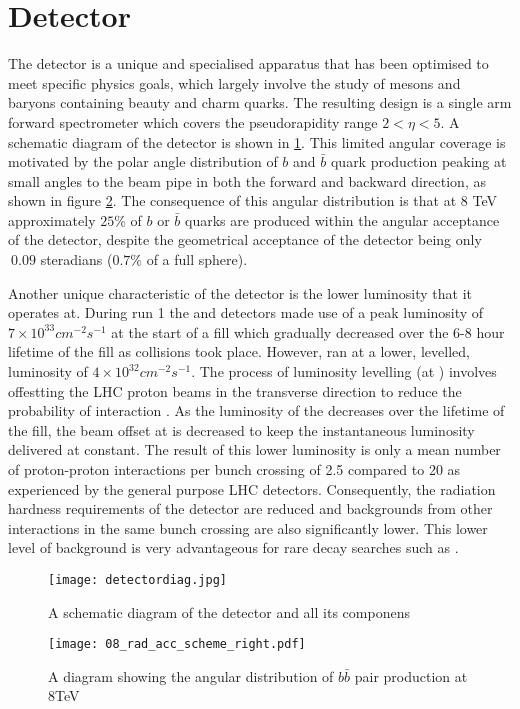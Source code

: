 
\section{Detector}
\label{sec:Detector}

The \lhcb detector is a unique and specialised apparatus that has been optimised to meet specific physics goals, which largely involve the study of mesons and baryons containing beauty and charm quarks.  The resulting design is a single arm forward spectrometer which covers the pseudorapidity range $2 < \eta < 5$.  A schematic diagram of the detector is shown in \ref{fig:detectdiag}.  This limited angular coverage is motivated by the polar angle distribution of  $b$ and $\bar{b}$ quark production peaking at small angles to the beam pipe in both the forward and backward direction, as shown in figure \ref{fig:bbarprod}.  The consequence of this angular distribution is that at 8 TeV approximately $25\%$ of $b$ or $\bar{b}$ quarks are produced within the angular acceptance of the \lhcb detector, despite the geometrical acceptance of the detector being only $~0.09$ steradians ($0.7\%$ of a full sphere).

Another unique characteristic of the \lhcb detector is the lower luminosity that it operates at.  During run 1 the \atlas and \cms detectors made use of a peak luminosity of $7\times 10^{33}cm^{-2}s^{-1}$ at the start of a fill which gradually decreased over the 6-8 hour lifetime of the fill as collisions took place.  However, \lhcb ran at a lower, levelled, luminosity of $4\times 10^{32}cm^{-2}s^{-1}$.  The process of luminosity levelling (at \lhcb) involves offestting the LHC proton beams in the transverse direction to reduce the probability of interaction \cite{Follin:2014nva}. As the luminosity of the \lhc decreases over the lifetime of the fill, the beam offset at \lhcb is decreased to keep the instantaneous luminosity delivered at \lhcb constant.  The result of this lower luminosity is only a mean number of proton-proton interactions per bunch crossing of 2.5 compared to 20 as experienced by the general purpose LHC detectors.  Consequently, the radiation hardness requirements of the \lhcb detector are reduced and backgrounds from other interactions in the same bunch crossing are also significantly lower.  This lower level of background is very advantageous for rare decay searches such as \Bz \to \muon \muon.
\begin{figure}[h]
  \centering
  \texttt{[image: detectordiag.jpg]}
  \caption{ A schematic diagram of the \lhcb detector and all its componens}
  \label{fig:detectdiag}
\end{figure}
\begin{figure}[h]
  \centering
  \texttt{[image: 08\_rad\_acc\_scheme\_right.pdf]}
  \caption{A diagram showing the angular distribution of $b \bar{b}$ pair production at 8TeV}
  \label{fig:bbarprod}
\end{figure}
